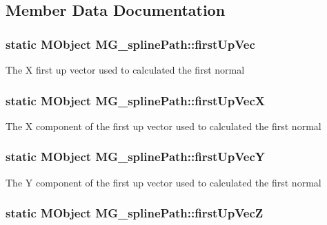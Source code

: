 \subsection{Member Data Documentation}
\hypertarget{class_m_g__spline_path_acc388654e041e9b08f17a18756555330}{
\subsubsection[{first\-Up\-Vec}]{\setlength{\rightskip}{0pt plus 5cm}static M\-Object M\-G\-\_\-spline\-Path\-::first\-Up\-Vec\hspace{0.3cm}{\ttfamily [static]}}}\label{class_m_g__spline_path_acc388654e041e9b08f17a18756555330}
The X first up vector used to calculated the first normal \hypertarget{class_m_g__spline_path_a64b96e5a494c4a404fa6ccfc5915ec00}{
\subsubsection[{first\-Up\-Vec\-X}]{\setlength{\rightskip}{0pt plus 5cm}static M\-Object M\-G\-\_\-spline\-Path\-::first\-Up\-Vec\-X\hspace{0.3cm}{\ttfamily [static]}}}\label{class_m_g__spline_path_a64b96e5a494c4a404fa6ccfc5915ec00}
The X component of the first up vector used to calculated the first normal \hypertarget{class_m_g__spline_path_ab398b0e9a0b111e9cbc4aaf884bce623}{
\subsubsection[{first\-Up\-Vec\-Y}]{\setlength{\rightskip}{0pt plus 5cm}static M\-Object M\-G\-\_\-spline\-Path\-::first\-Up\-Vec\-Y\hspace{0.3cm}{\ttfamily [static]}}}\label{class_m_g__spline_path_ab398b0e9a0b111e9cbc4aaf884bce623}
The Y component of the first up vector used to calculated the first normal \hypertarget{class_m_g__spline_path_ad16313a0a646376392bd5414083a41cf}{
\subsubsection[{first\-Up\-Vec\-Z}]{\setlength{\rightskip}{0pt plus 5cm}static M\-Object M\-G\-\_\-spline\-Path\-::first\-Up\-Vec\-Z\hspace{0.3cm}{\ttfamily [static]}}}\label{class_m_g__spline_path_ad16313a0a646376392bd5414083a41cf}
